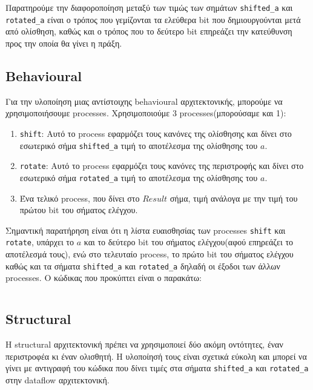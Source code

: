 \documentclass[11pt, a4paper]{report}
\begin{document}
Παρατηρούμε την διαφοροποίηση μεταξύ των τιμώς των σημάτων \texttt{shifted_a} και \texttt{rotated_a} είναι ο τρόπος που γεμίζονται τα ελεύθερα bit που δημιουργούνται μετά από ολίσθηση, καθώς και ο τρόπος που το δεύτερο bit επηρεάζει την κατεύθυνση προς την οποία θα γίνει η πράξη.

\subsection{Behavioural}
Για την υλοποίηση μιας αντίστοιχης behavioural αρχιτεκτονικής, μπορούμε να χρησιμοποιήσουμε processes.
Χρησιμοποιούμε 3 processes(μπορούσαμε και 1):
\begin{enumerate}
  \item \texttt{shift}: Αυτό το process εφαρμόζει τους κανόνες της ολίσθησης και δίνει στο εσωτερικό σήμα \texttt{shifted_a} τιμή το αποτέλεσμα της ολίσθησης του $a$.
  \item \texttt{rotate}: Αυτό το process εφαρμόζει τους κανόνες της περιστροφής και δίνει στο εσωτερικό σήμα \texttt{rotated_a} τιμή το αποτέλεσμα της ολίσθησης του $a$.
  \item Ένα τελικό process, που δίνει στο $Result$ σήμα, τιμή ανάλογα με την τιμή του πρώτου bit του σήματος ελέγχου.
\end{enumerate}

Σημαντική παρατήρηση είναι ότι η λίστα ευαισθησίας των processes \texttt{shift} και \texttt{rotate}, υπάρχει το $a$ και το δεύτερο bit του σήματος ελέγχου(αφού επηρεάζει το αποτέλεσμά τους), ενώ στο τελευταίο process, το πρώτο bit του σήματος ελέγχου καθώς και τα σήματα \texttt{shifted_a} και \texttt{rotated_a} δηλαδή οι έξοδοι των άλλων processes.
Ο κώδικας που προκύπτει είναι ο παρακάτω:
\inputminted[breaklines, linenos, firstline=32, lastline=62]{vhdl}{./code/part-2/alu-2/alu.vhdl}

\subsection{Structural}
Η structural αρχιτεκτονική πρέπει να χρησιμοποιεί δύο ακόμη οντότητες, έναν περιστροφέα κι έναν ολισθητή.
Η υλοποίησή τους είναι σχετικά εύκολη και μπορεί να γίνει με αντιγραφή του κώδικα που δίνει τιμές στα σήματα \texttt{shifted_a} και \texttt{rotated_a} στην dataflow αρχιτεκτονική.
\inputminted[breaklines, linenos]{vhdl}{./code/part-2/alu-2/shiftlr_4bit.vhdl}
\inputminted[breaklines, linenos]{vhdl}{./code/part-2/alu-2/rotatelr_4bit.vhdl}
\end{document}
